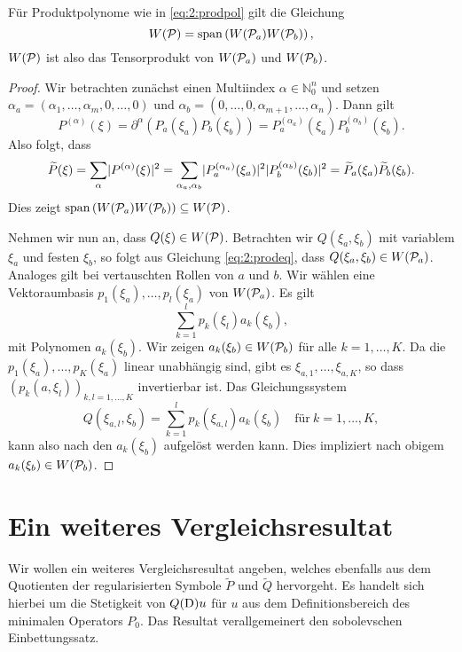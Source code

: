 \begin{thm}
Für Produktpolynome wie in \eqref{eq:2:prodpol}
gilt die Gleichung
\begin{equation}
W(\mathcal P)=\operatorname{span}\left(W(\mathcal P_a) W(\mathcal P_b)\right),
\end{equation}
$W(\mathcal P)$ ist also das Tensorprodukt von $W(\mathcal P_a)$ und $W(\mathcal P_b)$.
\end{thm}
\begin{proof}
Wir betrachten zunächst einen Multiindex $\alpha\in\mathbb N_0^n$ und setzen $\alpha_a=(\alpha_1,\dots,\alpha_m,0,\dots,0)$
und $\alpha_b=(0,\dots,0,\alpha_{m+1},\dots,\alpha_n)$. Dann gilt
\begin{equation}
P^{(\alpha)}(\xi)
=\partial^\alpha\left(P_a(\xi_a)P_b(\xi_b)\right)
=P^{(\alpha_a)}_a(\xi_a)P^{(\alpha_b)}_b(\xi_b).
\end{equation} 
Also folgt, dass
\begin{equation}\label{eq:2:prodeq}
\widetilde{P}(\xi)=\sum_\alpha\lvert P^{(\alpha)}(\xi)\rvert^2
=\sum_{\alpha_a,\alpha_b}\lvert P^{(\alpha_a)}_a(\xi_a)\rvert^2\lvert P^{(\alpha_b)}_b(\xi_b)\rvert^2
=\widetilde{P}_a(\xi_a)\widetilde{P}_b(\xi_b).
\end{equation}
Dies zeigt $\operatorname{span}\left(W(\mathcal P_a) W(\mathcal P_b)\right)\subseteq W(\mathcal P)$. 

Nehmen wir nun an, dass $Q(\xi)\in W(\mathcal P)$.
Betrachten wir $Q(\xi_a,\xi_{b})$ mit variablem $\xi_a$ und festen $\xi_{b}$,
so folgt aus Gleichung \eqref{eq:2:prodeq},
dass $Q(\xi_a,\xi_{b})\in W(\mathcal P_a)$.
Analoges gilt bei vertauschten Rollen von $a$ und $b$.
Wir wählen eine Vektoraumbasis $p_1(\xi_a),\dots,p_l(\xi_a)$ von $W(\mathcal P_a)$.
Es gilt
\begin{equation}
\sum_{k=1}^lp_k(\xi_l)a_k(\xi_b),
\end{equation}
mit Polynomen $a_k(\xi_b)$.
Wir zeigen $a_k(\xi_b)\in W(\mathcal P_b)$ für alle $k=1,\dots,K$.
Da die $p_1(\xi_a),\dots,p_K(\xi_a)$ linear unabhängig sind,
gibt es $\xi_{a,1},\dots,\xi_{a,K}$,
so dass $\left(p_k(a,\xi_l)\right)_{k,l=1,\dots,K}$ invertierbar ist.
Das Gleichungssystem
\begin{equation}
Q(\xi_{a,l},\xi_b)=\sum_{k=1}^lp_k(\xi_{a,l})a_k(\xi_b)\quad\text{für}~k=1,\dots,K,
\end{equation}
kann also nach den $a_k(\xi_b)$ aufgelöst werden kann.
Dies impliziert nach obigem $a_k(\xi_b)\in W(\mathcal P_b)$.
\end{proof}

\section{Ein weiteres Vergleichsresultat}
Wir wollen ein weiteres Vergleichsresultat angeben, welches ebenfalls aus dem Quotienten der regularisierten Symbole $\widetilde{P}$ und $ \widetilde{Q}$ hervorgeht. Es handelt sich hierbei um die Stetigkeit von $Q(\mathrm D) u$ für $u$ aus dem Definitionsbereich des minimalen Operators $P_0$. Das Resultat verallgemeinert den sobolevschen Einbettungssatz.


